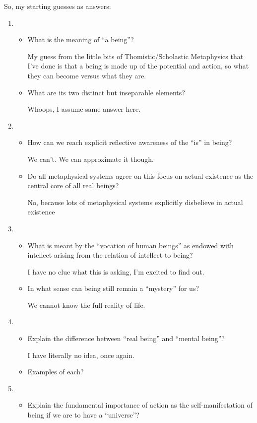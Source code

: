\documentclass[12pt]{article}[titlepage]
\newcommand{\say}[1]{``#1''}
\newcommand{\1}{\={a}}
\newcommand{\2}{\={e}}
\newcommand{\3}{\={\i}}
\newcommand{\4}{\=o}
\newcommand{\5}{\=u}
\newcommand{\6}{\={A}}
\renewcommand{\,}{\textsuperscript{,}}
\begin{document}
So, my starting guesses as answers:
\begin{enumerate}
\item \begin{itemize}
\item What is the meaning of \say{a being}?

My guess from the little bits of Thomistic/Scholastic Metaphysics that I've done is that a being is made up of the potential and action, so what they can become versus what they are.
\item What are its two distinct but inseparable elements?

Whoops, I assume same answer here.
\end{itemize}
\item \begin{itemize}
\item How can we reach explicit reflective awareness of the \say{is} in being?

We can't. We can approximate it though.
\item Do all metaphysical systems agree on this focus on actual existence as the central core of all real beings?

No, because lots of metaphysical systems explicitly disbelieve in actual existence
\end{itemize}
\item \begin{itemize}
\item What  is  meant  by  the  \say{vocation  of  human  beings} as endowed with intellect arising from the relation of intellect to being? 

I have no clue what this is asking, I'm excited to find out.
\item In what sense can being still remain a \say{mystery} for us?

We cannot know the full reality of life.
\end{itemize}
\item \begin{itemize}
\item Explain the difference between \say{real being} and \say{mental being}?

I have literally no idea, once again.
\item Examples of each?
\end{itemize}
\item \begin{itemize}
\item Explain the fundamental importance of action as the self-manifestation of being if we are to have a \say{universe}?


\end{itemize}
\end{enumerate}
\end{document}
